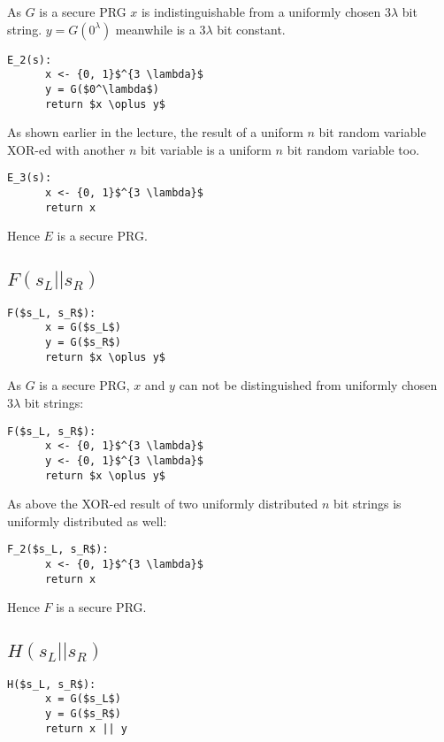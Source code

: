 \documentclass[a4paper]{scrreprt}
\begin{document}
As $G$ is a secure PRG $x$ is indistinguishable from a uniformly chosen $3
\lambda$ bit string. $y = G(0^\lambda)$ meanwhile is a $3 \lambda$ bit constant.

\begin{lstlisting}[mathescape=true, frame=single]
	E_2(s):
	  x <- {0, 1}$^{3 \lambda}$
	  y = G($0^\lambda$)
	  return $x \oplus y$
\end{lstlisting}

As shown earlier in the lecture, the result of a uniform $n$ bit random
variable XOR-ed with another $n$ bit variable is a uniform $n$ bit random
variable too.

\begin{lstlisting}[mathescape=true, frame=single]
	E_3(s):
	  x <- {0, 1}$^{3 \lambda}$
	  return x
\end{lstlisting}

Hence $E$ is a secure PRG.

\subsection{$F(s_L || s_R)$}

\begin{lstlisting}[mathescape=true, frame=single]
	F($s_L, s_R$):
	  x = G($s_L$)
	  y = G($s_R$)
	  return $x \oplus y$
\end{lstlisting}

As $G$ is a secure PRG, $x$ and $y$ can not be distinguished from uniformly
chosen $3 \lambda$ bit strings:

\begin{lstlisting}[mathescape=true, frame=single]
	F($s_L, s_R$):
	  x <- {0, 1}$^{3 \lambda}$
	  y <- {0, 1}$^{3 \lambda}$
	  return $x \oplus y$
\end{lstlisting}

As above the XOR-ed result of two uniformly distributed $n$ bit strings is
uniformly distributed as well:

\begin{lstlisting}[mathescape=true, frame=single]
	F_2($s_L, s_R$):
	  x <- {0, 1}$^{3 \lambda}$
	  return x
\end{lstlisting}

Hence $F$ is a secure PRG.

\subsection{$H(s_L || s_R)$}

\begin{lstlisting}[mathescape=true, frame=single]
	H($s_L, s_R$):
	  x = G($s_L$)
	  y = G($s_R$)
	  return x || y
\end{lstlisting}
\end{document}

